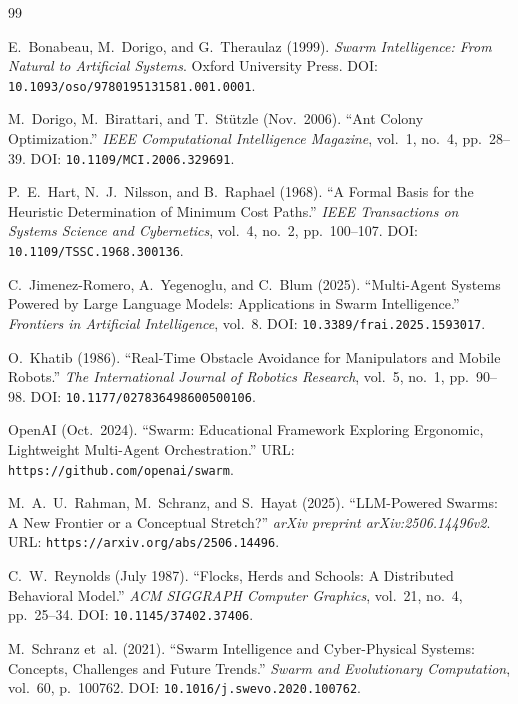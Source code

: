 \documentclass[11pt,a4paper,oneside]{report}
\begin{document}
\clearpage
\renewcommand{\bibname}{References}
\begin{thebibliography}{99}
{}

E.~Bonabeau, M.~Dorigo, and G.~Theraulaz (1999). \textit{Swarm Intelligence: From Natural to Artificial Systems}. Oxford University Press. DOI: \texttt{10.1093/oso/9780195131581.001.0001}.

M.~Dorigo, M.~Birattari, and T.~St\"{u}tzle (Nov.\ 2006). ``Ant Colony Optimization.'' \textit{IEEE Computational Intelligence Magazine}, vol.~1, no.~4, pp.~28--39. DOI: \texttt{10.1109/MCI.2006.329691}.

P.~E.~Hart, N.~J.~Nilsson, and B.~Raphael (1968). ``A Formal Basis for the Heuristic Determination of Minimum Cost Paths.'' \textit{IEEE Transactions on Systems Science and Cybernetics}, vol.~4, no.~2, pp.~100--107. DOI: \texttt{10.1109/TSSC.1968.300136}.

C.~Jimenez-Romero, A.~Yegenoglu, and C.~Blum (2025). ``Multi-Agent Systems Powered by Large Language Models: Applications in Swarm Intelligence.'' \textit{Frontiers in Artificial Intelligence}, vol.~8. DOI: \texttt{10.3389/frai.2025.1593017}.

O.~Khatib (1986). ``Real-Time Obstacle Avoidance for Manipulators and Mobile Robots.'' \textit{The International Journal of Robotics Research}, vol.~5, no.~1, pp.~90--98. DOI: \texttt{10.1177/027836498600500106}.

OpenAI (Oct.\ 2024). ``Swarm: Educational Framework Exploring Ergonomic, Lightweight Multi-Agent Orchestration.'' URL: \texttt{https://github.com/openai/swarm}.

M.~A.~U.~Rahman, M.~Schranz, and S.~Hayat (2025). ``LLM-Powered Swarms: A New Frontier or a Conceptual Stretch?'' \textit{arXiv preprint arXiv:2506.14496v2}. URL: \texttt{https://arxiv.org/abs/2506.14496}.

C.~W.~Reynolds (July 1987). ``Flocks, Herds and Schools: A Distributed Behavioral Model.'' \textit{ACM SIGGRAPH Computer Graphics}, vol.~21, no.~4, pp.~25--34. DOI: \texttt{10.1145/37402.37406}.

M.~Schranz et~al. (2021). ``Swarm Intelligence and Cyber-Physical Systems: Concepts, Challenges and Future Trends.'' \textit{Swarm and Evolutionary Computation}, vol.~60, p.~100762. DOI: \texttt{10.1016/j.swevo.2020.100762}.

\end{thebibliography}
\end{document}
